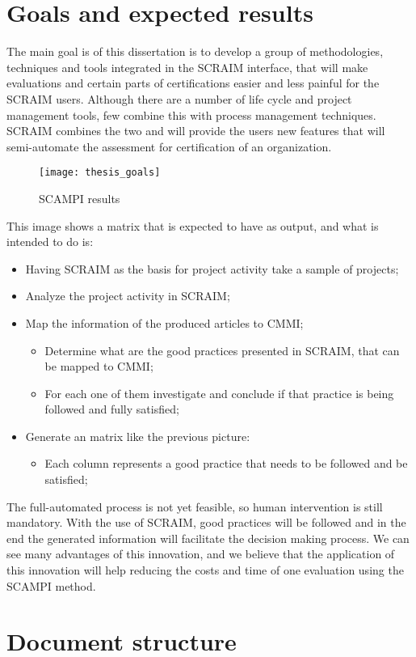 \section{Goals and expected results} \label{sec:goals}

The main goal is of this dissertation is to develop a group of methodologies, techniques and tools integrated in the SCRAIM interface, that will make evaluations and certain parts of certifications easier and less painful for the SCRAIM users.
Although there are a number of life cycle and project management tools, few combine this with process management techniques. SCRAIM combines the two and will provide the users new features that will semi-automate the assessment for certification of an organization. 

\begin{figure}[h]
	\begin{center}
		\leavevmode
		\texttt{[image: thesis\_goals]}
		\caption{SCAMPI results}
		\label{fig:arch}
	\end{center}
\end{figure}

This image shows a matrix that is expected to have as output, and what is intended to do is:
\begin{itemize}
	\item Having SCRAIM as the basis for project activity take a sample of projects;
	\item Analyze the project activity in SCRAIM;
	\item Map the information of the produced articles to CMMI;
	\begin{itemize}
		\item Determine what are the good practices presented in SCRAIM, that can be mapped to CMMI;
		\item For each one of them investigate and conclude if that practice is being followed and fully satisfied;
	\end{itemize}
	\item Generate an matrix like the previous picture:
	\begin{itemize}
		\item Each column represents a good practice that needs to be followed and be satisfied;
	\end{itemize}
\end{itemize}	

The full-automated process is not yet feasible, so human intervention is still mandatory. With the use of SCRAIM, good practices will be followed and in the end the generated information will facilitate the decision making process. We can see many advantages of this innovation, and we believe that the application of this innovation will help reducing the costs and time of one evaluation using the SCAMPI method.

\section{Document structure} \label{sec:Structure}